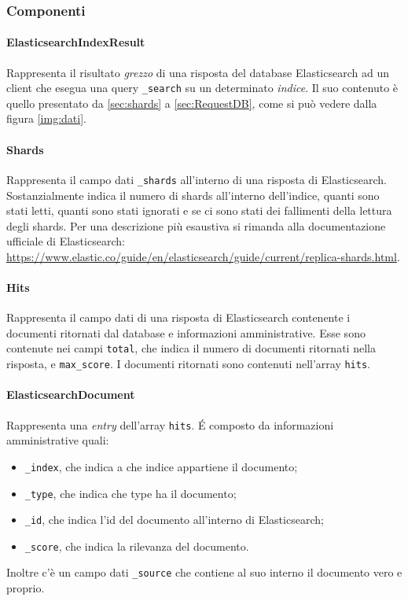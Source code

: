 \subsubsection{Componenti}

\paragraph{ElasticsearchIndexResult} \Spazio
\label{sec:elasticsearchIndexResult}
Rappresenta il risultato \emph{grezzo} di una risposta del database Elasticsearch ad un client che esegua una query \texttt{\_search} su un determinato \emph{indice}. Il suo contenuto è quello presentato da \ref{sec:shards} a \ref{sec:RequestDB}, come si può vedere dalla figura \ref{img:dati}.

\paragraph{Shards} \Spazio
\label{sec:shards}
Rappresenta il campo dati \texttt{\_shards} all'interno di una risposta di Elasticsearch. Sostanzialmente indica il numero di shards all'interno dell'indice, quanti sono stati letti, quanti sono stati ignorati e se ci sono stati dei fallimenti della lettura degli shards. Per una descrizione più esaustiva si rimanda alla documentazione ufficiale di Elasticsearch: \href{https://www.elastic.co/guide/en/elasticsearch/guide/current/replica-shards.html}{https://www.elastic.co/guide/en/elasticsearch/guide/current/replica-shards.html}.

\paragraph{Hits} \Spazio
Rappresenta il campo dati di una risposta di Elasticsearch contenente i documenti ritornati dal database e informazioni amministrative. Esse sono contenute nei campi \texttt{total}, che indica il numero di documenti ritornati nella risposta, e \texttt{max\_score}. I documenti ritornati sono contenuti nell'array \texttt{hits}.

\paragraph{ElasticsearchDocument} \Spazio
Rappresenta una \emph{entry} dell'array \texttt{hits}. É composto da informazioni amministrative quali:
\begin{itemize}
	\item \texttt{\_index}, che indica a che indice appartiene il documento;
	\item \texttt{\_type}, che indica che type ha il documento;
	\item \texttt{\_id}, che indica l'id del documento all'interno di Elasticsearch; 
	\item \texttt{\_score}, che indica la rilevanza del documento.
\end{itemize}
Inoltre c'è un campo dati \texttt{\_source} che contiene al suo interno il documento vero e proprio.

